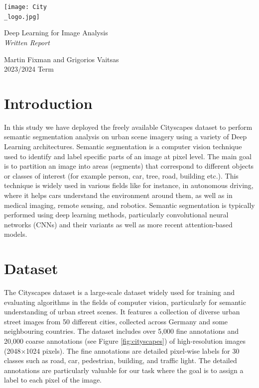 \documentclass[a4paper,11pt]{article}
\begin{document}
\begin{titlepage}
	\centering
	\texttt{[image: City\\\_logo.jpg]} \\[4em]
	\begin{bfseries}
		\begin{Huge}
			Deep Learning for Image Analysis \\[35pt]
			\textsl{Written Report}
		\end{Huge}
	\end{bfseries}
	\vfill{}
	\begin{LARGE}
		\begin{sffamily}
			Martin Fixman and Grigorios Vaitsas \\[10pt]
			2023/2024 Term
		\end{sffamily}
	\end{LARGE}
\end{titlepage}

\section{Introduction}
In this study we have deployed the freely available Cityscapes dataset \cite{DBLP:journals/corr/CordtsORREBFRS16} to perform semantic segmentation analysis on urban scene imagery using a variety of Deep Learning architectures. Semantic segmentation is a computer vision technique used to identify and label specific parts of an image at pixel level. The main goal is to partition an image into areas (segments) that correspond to different objects or classes of interest (for example person, car, tree, road, building etc.). This technique is widely used in various fields like for instance, in autonomous driving, where it helps cars understand the  environment around them, as well as in medical imaging, remote sensing, and robotics. Semantic segmentation is typically performed using deep learning methods, particularly convolutional neural networks (CNNs) and their variants as well as more recent attention-based models. 
\section{Dataset}
The Cityscapes dataset is a large-scale dataset widely used for training and evaluating algorithms in the fields of computer vision, particularly for semantic understanding of urban street scenes. It features a collection of diverse urban street images from 50 different cities, collected across Germany and some neighbouring countries. The dataset includes over 5,000 fine annotations and 20,000 coarse annotations (see Figure \ref{fig:cityscapes}) of high-resolution images (2048$\times$1024 pixels). The fine annotations are detailed pixel-wise labels for 30 classes such as road, car, pedestrian, building, and traffic light. The detailed annotations are particularly valuable for our task where the goal is to assign a label to each pixel of the image. 
\end{document}
